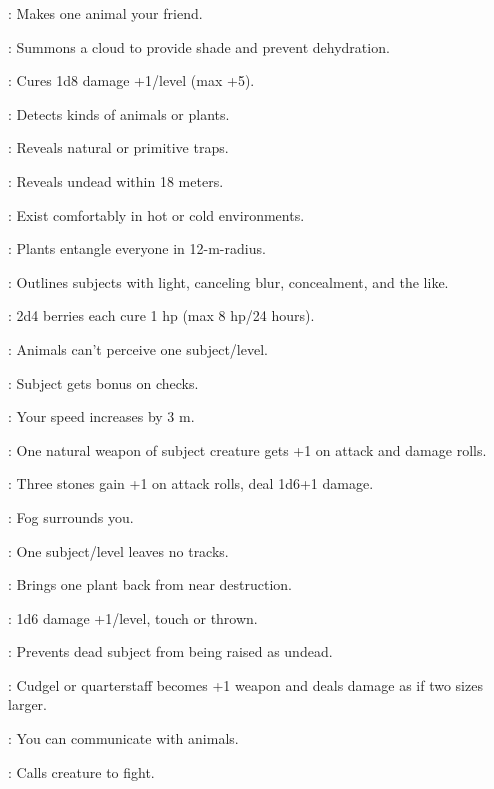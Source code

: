 : Makes one animal your friend.

: Summons a cloud to provide shade and prevent dehydration.

: Cures 1d8 damage +1/level (max +5).

: Detects kinds of animals or plants.

: Reveals natural or primitive traps.

: Reveals undead within 18 meters.

: Exist comfortably in hot or cold environments.

: Plants entangle everyone in 12-m-radius.

: Outlines subjects with light, canceling blur, concealment, and the like.

: 2d4 berries each cure 1 hp (max 8 hp/24 hours).

: Animals can't perceive one subject/level.

: Subject gets bonus on  checks.

: Your speed increases by 3 m.

: One natural weapon of subject creature gets +1 on attack and damage rolls.

: Three stones gain +1 on attack rolls, deal 1d6+1 damage.

: Fog surrounds you.

: One subject/level leaves no tracks.

: Brings one plant back from near destruction.

: 1d6 damage +1/level, touch or thrown.

: Prevents dead subject from being raised as undead.

: Cudgel or quarterstaff becomes +1 weapon and deals damage as if two sizes larger.

: You can communicate with animals.

: Calls creature to fight.



